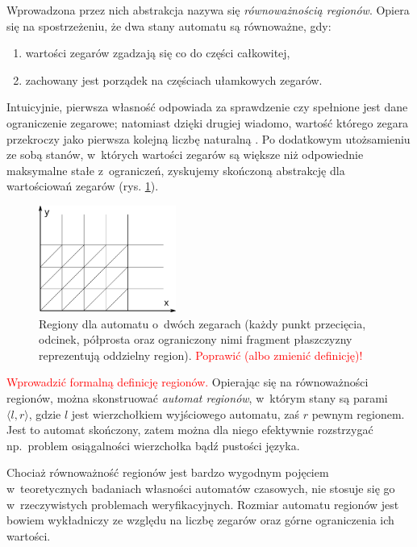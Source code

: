 \documentclass{pracamgr}
\newcommand{\todo}[1]{\textcolor{red}{#1}}
\newcommand{\pair}[2]{\langle #1, #2 \rangle}
\theoremstyle{plain}
\begin{document}
Wprowadzona przez nich abstrakcja nazywa się \emph{równoważnością
  regionów}. Opiera się na spostrzeżeniu, że dwa stany automatu są
równoważne, gdy:
\begin{samepage}
\begin{enumerate}
  \item wartości zegarów zgadzają się co do części całkowitej,
  \item zachowany jest porządek na częściach ułamkowych zegarów.
\end{enumerate}
\end{samepage}
Intuicyjnie, pierwsza własność odpowiada za sprawdzenie czy spełnione
jest dane ograniczenie zegarowe; natomiast dzięki drugiej wiadomo,
wartość którego zegara przekroczy jako pierwsza kolejną liczbę
naturalną \cite{am:decision}. Po dodatkowym utożsamieniu ze sobą
stanów, w~których wartości zegarów są większe niż odpowiednie
maksymalne stałe z~ograniczeń, zyskujemy skończoną abstrakcję dla
wartościowań zegarów (rys. \ref{img:regions}).
\begin{figure}
  \centering
  \includegraphics[width=0.4\textwidth]{img/ta-regions}
  \caption{Regiony dla automatu o~dwóch zegarach (każdy punkt
    przecięcia, odcinek, półprosta oraz ograniczony nimi fragment
    płaszczyzny reprezentują oddzielny region). \todo{Poprawić (albo
      zmienić definicję)!}}
  \label{img:regions}
\end{figure}
\todo{Wprowadzić formalną definicję regionów.}
Opierając się na równoważności regionów, można skonstruować
\emph{automat regionów}, w~którym stany są parami $\pair{l}{r}$, gdzie
$l$ jest wierzchołkiem wyjściowego automatu, zaś $r$ pewnym
regionem. Jest to automat skończony, zatem można dla niego efektywnie
rozstrzygać np.~problem osiągalności wierzchołka bądź pustości języka.

Chociaż równoważność regionów jest bardzo wygodnym pojęciem
w~teoretycznych badaniach własności automatów czasowych, nie stosuje się
go w~rzeczywistych problemach weryfikacyjnych. Rozmiar automatu
regionów jest bowiem wykładniczy ze względu na liczbę zegarów oraz
górne ograniczenia ich wartości.
\end{document}
